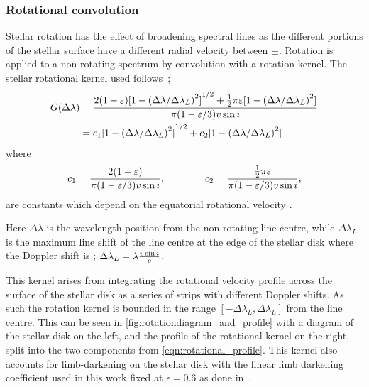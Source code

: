 \subsubsection*{Rotational convolution}
\label{subsubsec:rotational_convolution}
Stellar rotation has the effect of broadening spectral lines as the different portions of the stellar surface have a different radial velocity between \(\pm\)\Vsini{}.
Rotation is applied to a non-rotating spectrum by convolution with a rotation kernel.
The stellar rotational kernel used follows~\citet{gray_observation_2005};
\begin{align}
G(\Delta\lambda) &= \frac{2(1-\varepsilon){[1-{(\Delta\lambda /{\Delta\lambda}_{L})}^{2}]}^{1/2} + \frac{1}{2}\pi\varepsilon[1-{(\Delta\lambda /{\Delta\lambda}_{L})}^{2}]}{\pi (1-\varepsilon/3) v\sin{i}}\\
&= c_{1}{[1- {(\Delta\lambda /\Delta\lambda_{L})}^{2}]}^{1/2} + c_{2}[1-{(\Delta\lambda /\Delta\lambda_{L})}^{2}] \label{eqn:rotational_profile}
\end{align}
where
\begin{equation}
{c}_{1} = \frac{2(1-\varepsilon)} {\pi (1-\varepsilon/3)v\sin{i}}, \hspace{4em} {c}_{2} = \frac{\frac{1}{2}\pi\varepsilon} {\pi (1-\varepsilon/3)v\sin{i}},
\end{equation}
are constants which depend on the equatorial rotational velocity \Vsini{}.

Here $\Delta\lambda$ is the wavelength position from the non-rotating line centre, while $\Delta\lambda_{L}$ is the maximum line shift of the line centre at the edge of the stellar disk where the Doppler shift is \Vsini{}; $\Delta\lambda_{L} = \lambda \frac{v\sin{i}}{c}$.

This kernel arises from integrating the rotational velocity profile across the surface of the stellar disk as a series of strips with different Doppler shifts.
As such the rotation kernel is bounded in the range $[-\Delta\lambda_L, \Delta\lambda_{L}]$ from the line centre.
This can be seen in \cref{fig:rotationdiagram_and_profile} with a diagram of the stellar disk on the left, and the profile of the rotational kernel on the right, split into the two components from \cref{eqn:rotational_profile}.
This kernel also accounts for limb-darkening on the stellar disk with the linear limb darkening coefficient used in this work fixed at $\epsilon=0.6$ as done in~\citet{figueira_radial_2016}.

